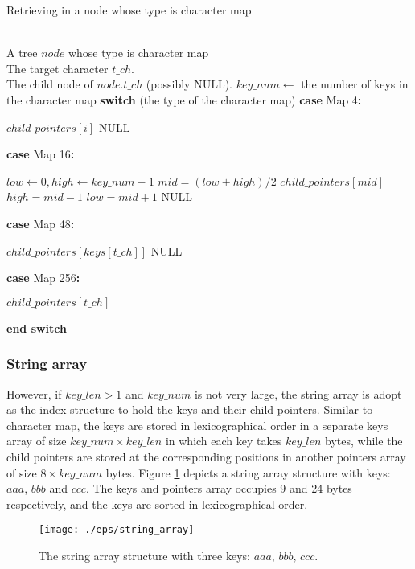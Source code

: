 \documentclass[legalpaper]{article}
\makeatletter
\newcommand{\SWITCH}[1]{\STATE \textbf{switch} (#1)}
\newcommand{\ENDSWITCH}{\STATE \textbf{end switch}}
\newcommand{\CASE}[1]{\STATE \textbf{case} #1\textbf{:} \begin{ALC@g}}
\newcommand{\ENDCASE}{\end{ALC@g}}
\makeatother
\begin{document}
\begin{algorithm}
  \caption{Retrieving in a node whose type is character map}
  \label{alg:mc}
  \begin{algorithmic}[1]
    \REQUIRE ~~\\
    A tree $node$ whose type is character map\\
    The target character $t\_ch$.
    \ENSURE ~~\\
    The child node of $node.t\_ch$ (possibly NULL).
    \STATE
    \STATE $key\_num \leftarrow$ the number of keys in the character map
    \STATE
    \SWITCH{the type of the character map}
    \CASE{Map 4}
    \RETURN $child\_pointers[i]$
    \ENDIF
    \ENDFOR
    \RETURN NULL
    \ENDCASE
    \STATE
    \CASE{Map 16}
    \STATE $low \leftarrow 0, high \leftarrow key\_num-1$
    \STATE $mid = (low+high)/2$
    \RETURN $child\_pointers[mid]$
    \STATE $high=mid-1$
    \ELSE
    \STATE $low=mid+1$
    \ENDIF
    \ENDWHILE
    \RETURN NULL
    \ENDCASE
    \STATE
    \CASE{Map 48}
    \RETURN $child\_pointers[keys[t\_ch]]$
    \ELSE
    \RETURN NULL
    \ENDIF
    \ENDCASE
    \STATE
    \CASE{Map 256}
    \RETURN $child\_pointers[t\_ch]$
    \ENDCASE
    \ENDSWITCH
  \end{algorithmic}
\end{algorithm}

\subsubsection{String array}
\label{sec:string array}

However, if $key\_len > 1$ and $key\_num$ is not very large, the
\textsf{string array} is adopt as the index structure to hold the keys
and their child pointers. Similar to character map, the keys are
stored in lexicographical order in a separate keys array of size
$key\_num \times key\_len$ in which each key takes $key\_len$ bytes,
while the child pointers are stored at the corresponding positions in
another pointers array of size $8 \times key\_num$ bytes. Figure
\ref{fig:string array} depicts a string array structure with keys:
$aaa$, $bbb$ and $ccc$. The keys and pointers array occupies 9 and 24
bytes respectively, and the keys are sorted in lexicographical order.

\begin{figure}[htbp]
  \label{fig:string array}
  \centering
  \texttt{[image: ./eps/string\_array]}
  \caption{The string array structure with three keys: $aaa,\, bbb,\, ccc$.}
\end{figure}
\end{document}
